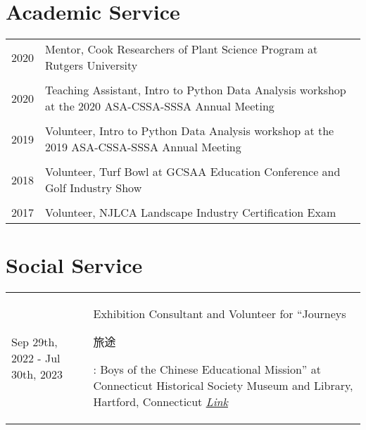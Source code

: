 \documentclass[letterpaper,11pt, english]{article}
\begin{document}
\section{Academic Service}
\begin{flushleft}
  \begin{tabularx}{\textwidth}{@{}lX@{}}
      2020 \hspace{4.7cm} & Mentor, Cook Researchers of Plant Science Program at Rutgers University \\
      \\[-0.2cm] 
      2020 \hspace{4.7cm} & Teaching Assistant, Intro to Python Data Analysis workshop at the 2020 ASA-CSSA-SSSA Annual Meeting \\
      \\[-0.2cm] 
      2019 \hspace{4.7cm} & Volunteer, Intro to Python Data Analysis workshop at the 2019 ASA-CSSA-SSSA Annual Meeting \\
      \\[-0.2cm] 
      2018 \hspace{4.7cm} & Volunteer, Turf Bowl at GCSAA Education Conference and Golf Industry Show \\
      \\[-0.2cm] 
      2017 \hspace{4.7cm} & Volunteer, NJLCA Landscape Industry Certification Exam \\
  \end{tabularx}
\end{flushleft}

\section{Social Service}
\begin{flushleft}
  \begin{tabularx}{\textwidth}{@{}p{3cm}@{\hspace{2.5cm}}X@{}}
    Sep 29th, 2022 - Jul 30th, 2023  & Exhibition Consultant and Volunteer for “Journeys \begin{CJK*}{UTF8}{gbsn}旅途\end{CJK*}: Boys of the Chinese Educational Mission” at Connecticut Historical Society Museum and Library, Hartford, Connecticut \emph{\href{https://chs.org/exhibition/journeys/ }{\color{blue}Link}}\\
  \end{tabularx}
\end{flushleft}
\end{document}
